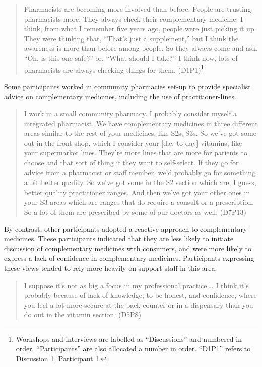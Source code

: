 \documentclass[11pt,a4paper]{article}
\begin{document}
\begin{quote}
Pharmacists are becoming more involved than before. People are trusting
pharmacists more. They always check their complementary medicine. I
think, from what I remember five years ago, people were just picking it
up. They were thinking that, ``That's just a supplement,'' but I think
the awareness is more than before among people. So they always come and
ask, ``Oh, is this one safe?'' or, ``What should I take?'' I think now,
lots of pharmacists are always checking things for them.
(D1P1)\footnote{Workshops and interviews are labelled as ``Discussions''
  and numbered in order. ``Participants'' are also allocated a number in
  order. ``D1P1'' refers to Discussion 1, Participant 1.}
\end{quote}

Some participants worked in community pharmacies set-up to provide
specialist advice on complementary medicines, including the use of
practitioner-lines.

\begin{quote}
I work in a small community pharmacy. I probably consider myself a
integrated pharmacist. We have complementary medicines in three
different areas similar to the rest of your medicines, like S2s, S3s. So
we've got some out in the front shop, which I consider your
{[}day-to-day{]} vitamins, like your supermarket lines. They're more
lines that are more for patients to choose and that sort of thing if
they want to self-select. If they go for advice from a pharmacist or
staff member, we'd probably go for something a bit better quality. So
we've got some in the S2 section which are, I guess, better quality
practitioner ranges. And then we've got your other ones in your S3 areas
which are ranges that do require a consult or a prescription. So a lot
of them are prescribed by some of our doctors as well. (D7P13)
\end{quote}

By contrast, other participants adopted a reactive approach to
complementary medicines. These participants indicated that they are less
likely to initiate discussion of complementary medicines with consumers,
and were more likely to express a lack of confidence in complementary
medicines. Participants expressing these views tended to rely more
heavily on support staff in this area.

\begin{quote}
I suppose it's not as big a focus in my professional practice\ldots{}. I
think it's probably because of lack of knowledge, to be honest, and
confidence, where you feel a lot more secure at the back counter or in a
dispensary than you do out in the vitamin section. (D5P8)
\end{quote}
\end{document}
